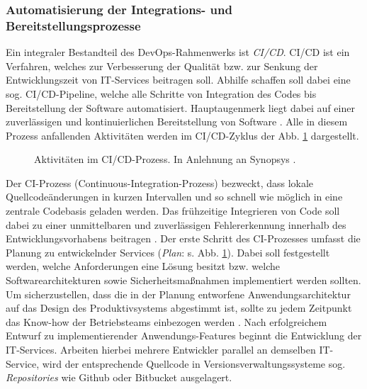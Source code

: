 \subsubsection{Automatisierung der Integrations- und Bereitstellungsprozesse}
\label{sec:CICD}
 Ein integraler Bestandteil des DevOps-Rahmen\-werks ist \textit{\ac{CI/CD}}. CI/CD ist ein Verfahren, welches zur Verbesserung der Qualität bzw. zur Senkung der Entwicklungszeit von IT-Services beitragen soll. Abhilfe schaffen soll dabei eine sog. CI/CD-Pipeline, welche alle Schritte von Integration des Codes  bis Bereitstellung der Software automatisiert. Hauptaugenmerk liegt dabei auf einer zuverlässigen und kontinuierlichen Bereitstellung von Software \cite[471]{Zampetti.92720211012021}. Alle in diesem Prozess anfallenden Aktivitäten werden im CI/CD-Zyklus der Abb. \ref{fig:CICD_Cycle} dargestellt. 
 \begin{center}
	\begin{figure}[H]
		\centering
		\captionsetup{format=myformat}
		\caption[Aktivitäten im CI/CD-Prozess]{Aktivitäten im CI/CD-Prozess. In Anlehnung an Synopsys \cite{.20230201}.}
		\label{fig:CICD_Cycle}
	\end{figure}
\end{center}
\vspace*{-15mm}
Der \acs{CI}-Prozess (Continuous-Integration-Prozess) bezweckt, dass lokale Quellcode\-änderungen in kurzen Intervallen und so schnell wie möglich in eine zentrale Codebasis geladen werden. Das frühzeitige Integrieren von Code soll dabei zu einer unmittelbaren und zuverlässigen Fehlererkennung innerhalb des Entwicklungsvorhabens beitragen \cite[471]{Zampetti.92720211012021}. 
Der erste Schritt des CI-Prozesses umfasst die Planung zu entwickelnder Services (\textit{Plan}: s. Abb. \ref{fig:CICD_Cycle}). Dabei soll festgestellt werden, welche Anforderungen eine Lösung besitzt bzw. welche Softwarearchitekturen sowie Sicherheitsmaßnahmen implementiert werden sollten. Um sicherzustellen, dass die in der Planung entworfene Anwendungsarchitektur auf das Design des Produktivsystems abgestimmt ist, sollte zu jedem Zeitpunkt das Know-how der Betriebsteams einbezogen werden \cite[16]{Halstenberg.2020}. Nach erfolgreichem Entwurf zu implementierender Anwendungs-Features beginnt die Entwicklung der IT-Services. Arbeiten hierbei mehrere Entwickler parallel an demselben IT-Service, wird der entsprechende Quellcode in Versionsverwaltungssysteme sog. \textit{Repositories} wie Github oder Bitbucket ausgelagert.
